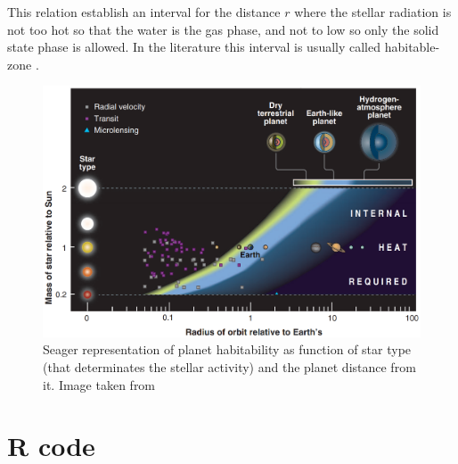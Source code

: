 \documentclass[
12pt, %
a4paper, %
oneside, %
headinclude,footinclude, %
BCOR5mm, %
]{scrartcl}
\begin{document}
This relation establish an interval for the distance $r$ where the stellar radiation is not too hot so that the water is the gas phase, and not to low so only the solid state phase is allowed. In the literature this interval is usually called habitable-zone \cite{kasting1993habitable}.

\begin{figure}[h]
\begin{center}
\includegraphics[width=1\textwidth]{Pic/Planets_habitability_Seager.png}
\caption{Seager representation of planet habitability as function of star type (that determinates the stellar activity) and the planet distance from it. Image taken from \cite{seager2013exoplanet}}
\label{Planets_habitability_Seager}
\end{center}
\end{figure}






\section{R code}
\begin{lstlisting}


\end{lstlisting}




\renewcommand{\refname}{\spacedlowsmallcaps{References}} %




\end{document}
